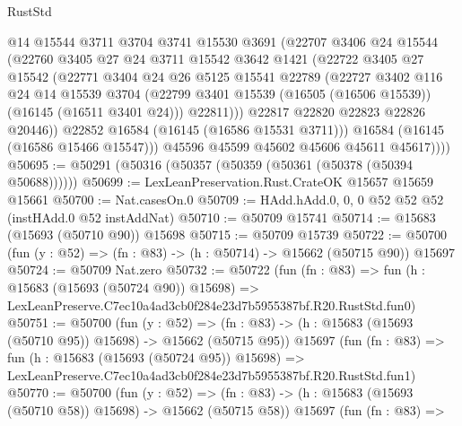 \begin{lexlean}{RustStd}
\begin{coremodule}
                @14
                @15544
                @3711
                @3704
                @3741
                @15530
                @3691
                (@22707
                  @3406
                  @24
                  @15544
                  (@22760
                    @3405
                    @27
                    @24
                    @3711
                    @15542
                    @3642
                    @1421
                    (@22722
                      @3405
                      @27
                      @15542
                      (@22771
                        @3404
                        @24
                        @26
                        @5125
                        @15541
                        @22789
                        (@22727
                          @3402
                          @116
                          @24
                          @14
                          @15539
                          @3704
                          (@22799 @3401 @15539 (@16505 (@16506 @15539)) (@16145 (@16511 @3401 @24)))
                          @22811)))
                    @22817
                    @22820
                    @22823
                    @22826
                    @20446))
                @22852
                @16584
                (@16145 (@16586 @15531 @3711)))
              @16584
              (@16145 (@16586 @15466 @15547)))
            @45596
            @45599
            @45602
            @45606
            @45611
            @45617))))
@50695 := @50291 (@50316 (@50357 (@50359 (@50361 (@50378 (@50394 @50688))))))
@50699 := LexLeanPreservation.Rust.CrateOK @15657 @15659 @15661
@50700 := Nat.casesOn.{0}
@50709 := HAdd.hAdd.{0, 0, 0} @52 @52 @52 (instHAdd.{0} @52 instAddNat)
@50710 := @50709 @15741
@50714 := @15683 (@15693 (@50710 @90)) @15698
@50715 := @50709 @15739
@50722 := @50700 (fun (y : @52) => (fn : @83) -> (h : @50714) -> @15662 (@50715 @90)) @15697
@50724 := @50709 Nat.zero
@50732 := @50722
    (fun (fn : @83) =>
    fun (h : @15683 (@15693 (@50724 @90)) @15698) =>
    LexLeanPreserve.C7ec10a4ad3cb0f284e23d7b5955387bf.R20.RustStd.fun0)
@50751 := @50700
    (fun (y : @52) =>
    (fn : @83) -> (h : @15683 (@15693 (@50710 @95)) @15698) -> @15662 (@50715 @95))
    @15697
    (fun (fn : @83) =>
    fun (h : @15683 (@15693 (@50724 @95)) @15698) =>
    LexLeanPreserve.C7ec10a4ad3cb0f284e23d7b5955387bf.R20.RustStd.fun1)
@50770 := @50700
    (fun (y : @52) =>
    (fn : @83) -> (h : @15683 (@15693 (@50710 @58)) @15698) -> @15662 (@50715 @58))
    @15697
    (fun (fn : @83) =>

\end{coremodule}
\end{lexlean}
